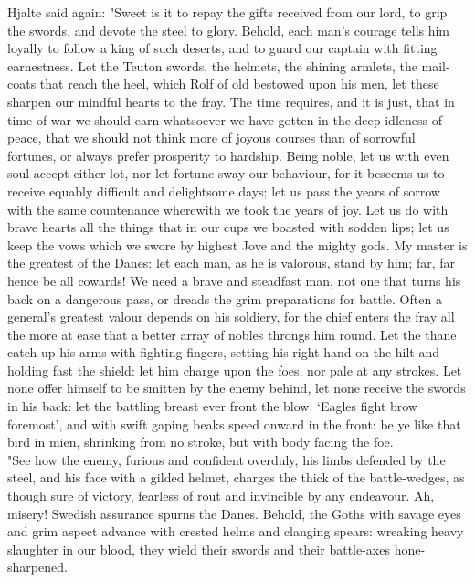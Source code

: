 \documentclass[10pt,a4paper]{report}
\begin{document}
Hjalte said again: "Sweet is it to repay the gifts received from our lord, to grip the swords, and devote the steel to glory. Behold, each man's courage tells him loyally to follow a king of such deserts, and to guard our captain with fitting earnestness. Let the Teuton swords, the helmets, the shining armlets, the mail-coats that reach the heel, which Rolf of old bestowed upon his men, let these sharpen our mindful hearts to the fray. The time requires, and it is just, that in time of war we should earn whatsoever we have gotten in the deep idleness of peace, that we should not think more of joyous courses than of sorrowful fortunes, or always prefer prosperity to hardship. Being noble, let us with even soul accept either lot, nor let fortune sway our behaviour, for it beseems us to receive equably difficult and delightsome days; let us pass the years of sorrow with the same countenance wherewith we took the years of joy. Let us do with brave hearts all the things that in our cups we boasted with sodden lips; let us keep the vows which we swore by highest Jove and the mighty gods. My master is the greatest of the Danes: let each man, as he is valorous, stand by him; far, far hence be all cowards! We need a brave and steadfast man, not one that turns his back on a dangerous pass, or dreads the grim preparations for battle. Often a general's greatest valour depends on his soldiery, for the chief enters the fray all the more at ease that a better array of nobles throngs him round. Let the thane catch up his arms with fighting fingers, setting his right hand on the hilt and holding fast the shield: let him charge upon the foes, nor pale at any strokes. Let none offer himself to be smitten by the enemy behind, let none receive the swords in his back: let the battling breast ever front the blow. `Eagles fight brow foremost', and with swift gaping beaks speed onward in the front: be ye like that bird in mien, shrinking from no stroke, but with body facing the foe.\\

"See how the enemy, furious and confident overduly, his limbs defended by the steel, and his face with a gilded helmet, charges the thick of the battle-wedges, as though sure of victory, fearless of rout and invincible by any endeavour. Ah, misery! Swedish assurance spurns the Danes. Behold, the Goths with savage eyes and grim aspect advance with crested helms and clanging spears: wreaking heavy slaughter in our blood, they wield their swords and their battle-axes hone-sharpened.\\
\end{document}
